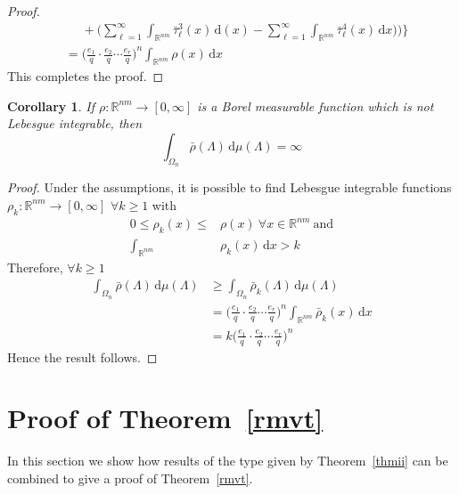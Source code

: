 \documentclass[11pt]{article}
\newtheorem{corollary}[theorem]{Corollary}
\theoremstyle{definition}
\theoremstyle{proof}
\begin{document}
\begin{proof}
\begin{align*}
        & \ \ \ \ \ \ + \Bigg(\sum_{\ell=1}^{\infty} \int_{\mathbb{R}^{nm}}{\bar{\tau }}_{\ell}^{3}(x) \, \mathrm{d} (x) - \sum_{\ell=1}^{\infty}\int_{\mathbb{R}^{nm}} {\bar{\tau }}_{\ell}^{4} (x) \, \mathrm{d} x) \Bigg) \Bigg\} \\
        &= {\bigg(\frac{e_1}{q} \cdot \frac{e_2}{q} \cdots \frac{e_r}{q} \bigg)}^n \int_{\mathbb{R}^{nm}} \rho (x) \, \mathrm{d} x
    \end{align*}
    This completes the proof.
\end{proof}

\begin{corollary}\label{cori}
    If $ \rho : \mathbb{R}^{nm} \to [0, \infty]$ is a Borel measurable function which is not Lebesgue integrable, then
    \[
        \int_{{\Omega}_n}  \bar{\rho }(\Lambda ) \, \mathrm{d} \mu (\Lambda ) = \infty
    \]
\end{corollary}
\begin{proof}
    Under the assumptions, it is possible to find Lebesgue integrable functions $\rho _k: \mathbb{R}^{nm} \to [0, \infty]$ $\forall k \geq 1$ with
    \begin{align*}
        0 \leq \rho _k(x) \leq &\rho (x) \ \forall x \in \mathbb{R}^{nm} \ \text{and}\\
        \int_{\mathbb{R}^{nm}} &\rho _k(x) \, \mathrm{d} x > k
    \end{align*}
    Therefore, $\forall k \geq 1$
    \begin{align*}
        \int_{{\Omega}_n} \bar{\rho }(\Lambda ) \, \mathrm{d} \mu (\Lambda ) &\geq \int_{{\Omega}_n} \bar{\rho }_k (\Lambda ) \, \mathrm{d} \mu (\Lambda ) \\
        &= {\bigg(\frac{e_1}{q} \cdot \frac{e_2}{q} \cdots \frac{e_r}{q} \bigg)}^n \int_{\mathbb{R}^{nm}} \bar{\rho }_k(x) \, \mathrm{d} x \\
        &= k{\bigg(\frac{e_1}{q} \cdot \frac{e_2}{q} \cdots \frac{e_r}{q} \bigg)}^n
    \end{align*}
    Hence the result follows.
\end{proof}

\section{Proof of Theorem~\ref{rmvt}}\label{proofrmvt}
In this section we show how results of the type given by Theorem~\ref{thmii} can be combined to give a proof of Theorem~\ref{rmvt}.
\end{document}
